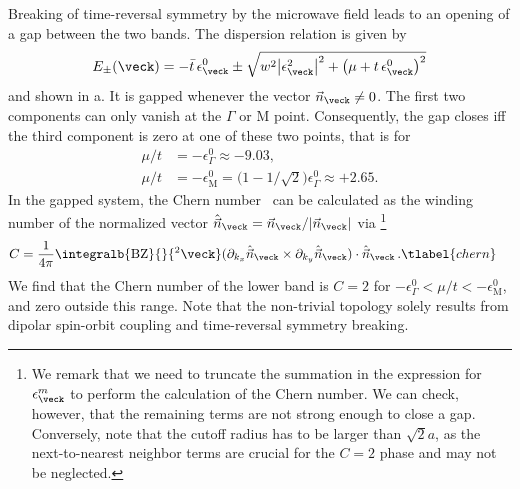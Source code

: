 Breaking of time-reversal symmetry by the microwave field leads to an opening of a gap between the two bands.
The dispersion relation is given by
\begin{align}
    E_\pm(\veck)=- \bar{t}\, \epsilon^0_\veck \pm \sqrt{w^2 \big|\epsilon^2_{\veck}\big|^2+\big(\mu+t\, \epsilon^0_{\veck}\big)^2}
\end{align}
and shown in a.
It is gapped whenever the vector $\vec{n}_{\veck}\ne 0$.
The first two components can only vanish at the $\Gamma$ or $\text{M}$ point.
Consequently, the gap closes iff the third component is zero at one of these two points, that is for
\begin{align} %
    \mu/t &= -\epsilon^0_{\Gamma} \approx -9.03, \nonumber\\
    \mu/t &= -\epsilon^0_\text{M} = \Big(1-1/\sqrt{2}\Big)\epsilon_{\Gamma}^0 \approx +2.65.
\end{align}
In the gapped system, the Chern number~\cite{Hasan2010,Qi2011} can be calculated as the winding number of the normalized vector $\hat{\vec{n}}_\veck = \vec{n}_\veck/|\vec{n}_\veck|$ via
\footnote{We remark that we need to truncate the summation in the expression for $\epsilon^m_{\veck}$ to perform the calculation of the Chern number.
We can check, however, that the remaining terms are not strong enough to close a gap.
Conversely, note that the cutoff radius has to be larger than $\sqrt{2}a$, as the next-to-nearest neighbor terms are crucial for the $C=2$ phase and may not be neglected.}
\begin{align}
    C &= \frac{1}{4\pi}\integralb{\text{BZ}}{}{^2\veck} ( \partial_{k_x} \hat{\vec{n}}_{\veck} \times \partial_{k_y} \hat{\vec{n}}_{\veck} ) \cdot \hat{\vec{n}}_{\veck} \, . \tlabel{chern}
\end{align}
We find that the Chern number of the lower band is $C=2$ for $-\epsilon^0_{\Gamma} < \mu/t < -\epsilon^0_\text{M}$, and zero outside this range.
Note that the non-trivial topology solely results from dipolar spin-orbit coupling and time-reversal symmetry breaking.



